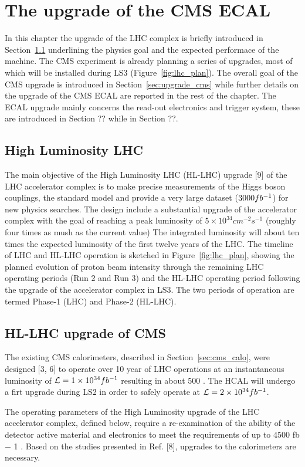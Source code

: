 \chapter{The upgrade of the CMS ECAL}
\label{chapter:ecal_upgrade}

In this chapter the upgrade of the LHC complex is briefly introduced in Section~\ref{upgrade_lhc}
underlining the physics goal and the expected performace of the machine. The CMS experiment is already planning
a series of upgrades, most of which will be installed during LS3 (Figure~\ref{fig:lhc_plan}).
The overall goal of the CMS upgrade is introduced in Section~\ref{sec:upgrade_cms} while
further details on the upgrade of the CMS ECAL are reported in the rest of the chapter.
The ECAL upgrade mainly concerns the read-out electronics and trigger system, these are introduced in Section ??
while in Section ??.

\section{High Luminosity LHC}
\label{upgrade_lhc}

The main objective of the High Luminosity LHC (HL-LHC) upgrade [9] of the LHC accelerator complex
is to make precise measurements of the Higgs boson couplings, the standard model and provide a very
large dataset ($3000fb^{-1}$) for new physics searches.
The design include a substantial upgrade of the accelerator complex with the goal of reaching
a peak luminosity of $5\times10^{34} cm^{-2}s^{-1}$ (roughly four times as mush as the current value)
The integrated luminosity will about ten times the expected luminosity of the first twelve
years of the LHC.
The timeline of LHC and HL-LHC operation is sketched in Figure~\ref{fig:lhc_plan}, showing the planned
evolution of proton beam intensity through the remaining LHC operating periods (Run 2 and Run 3)
and the HL-LHC operating period following the upgrade of the accelerator complex in LS3.
The two periods of operation are termed Phase-1 (LHC) and Phase-2 (HL-LHC).



\section{HL-LHC upgrade of CMS}
\label{upgrade_cms}
The existing CMS calorimeters, described in Section~\ref{sec:cms_calo},
were designed [3, 6] to operate over 10 year of LHC operations at an instantaneous luminosity
of $\mathcal{L} = 1\times10^{34}fb^{-1}$ resulting in about 500 \fbinv. The HCAL will undergo a firt upgrade
during LS2 in order to safely operate at $\mathcal{L} = 2\times10^{34}fb^{-1}$.

The operating parameters of the High Luminosity
upgrade of the LHC accelerator complex, defined below, require a re-examination of the ability
of the detector active material and electronics to meet the requirements of up to 4500 fb − 1 .
Based on the studies presented in Ref. [8], upgrades to the calorimeters are necessary.